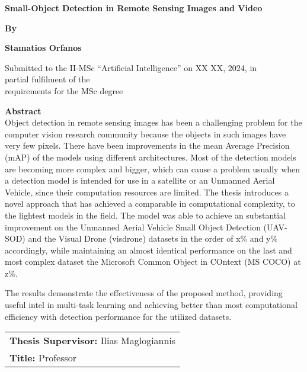 




\begin{center}
    \textbf{\Large Small-Object Detection in Remote Sensing Images and Video}
\end{center}

\vspace{0.05in}

\begin{center}
    \textbf{\large By}
\end{center}

\vspace{0.05in}

\begin{center}
    \textbf{\large Stamatios Orfanos}
\end{center}

\vspace{0.05in}

\begin{center}
    Submitted to the II-MSc “Artificial Intelligence” on XX XX, 2024, in \\
    partial fulfilment of the \\
    requirements for the MSc degree
\end{center}





\vspace{1cm}

\textbf{\Large Abstract} \\
Object detection in remote sensing images has been a challenging problem for the computer vision research community because the objects in such images have very few
pixels. There have been improvements in the mean Average Precision (mAP) of the models using different architectures. Most of the detection models are becoming more 
complex and bigger, which can cause a problem usually when a detection model is intended for use in a satellite or an Unmanned Aerial Vehicle, since their computation 
resources are limited. The thesis introduces a novel approach that has achieved a comparable in computational complexity, to the lightest models in the field.
The model was able to achieve an substantial improvement on the Unmanned Aerial Vehicle Small Object Detection (UAV-SOD) and the Visual Drone (visdrone) datasets in 
the order of x\% and y\% accordingly, while maintaining an almost identical performance on the last and most complex dataset the Microsoft Common Object 
in COntext (MS COCO) at z\%.

The results demonstrate the effectiveness of the proposed method, providing useful intel in multi-task learning and achieving better than most 
computational efficiency with detection performance for the utilized datasets.



\vspace{3.5in}


\begin{tabular}{l}
    \textbf{Thesis Supervisor:} Ilias Maglogiannis \\
    \textbf{Title:} Professor
\end{tabular}


